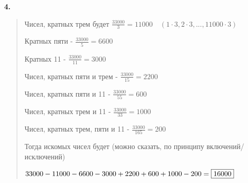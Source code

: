 \documentclass{article}
\begin{document}
\textsf{\textbf{4.}}
\begin{quote}
  Чисел, кратных трем будет $\frac{33000}{3} = 11000 \quad (1 \cdot 3 , 2 \cdot 3, ... , 11000 \cdot 3)$
  
  Кратных пяти - $\frac{33000}{5} = 6600$
  
  Кратных 11 - $\frac{33000}{11} = 3000$

  Чисел, кратных пяти и трем - $\frac{33000}{15} = 2200$
  
  Чисел, кратных пяти и 11 - $\frac{33000}{55} = 600$
  
  Чисел, кратных трем и 11 - $\frac{33000}{33} = 1000$
  
  Чисел, кратных трем, пяти и 11 - $\frac{33000}{165} = 200$

  Тогда искомых чисел будет (можно сказать, по принципу включений/исключений)
  
  $33000 - 11000 - 6600 - 3000 + 2200 + 600 + 1000 - 200 = \fbox{16000}$
\end{quote}
\end{document}
